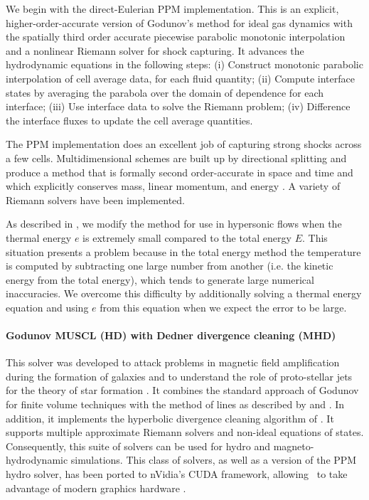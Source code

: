 We begin with the direct-Eulerian PPM implementation.  This is an
explicit, higher-order-accurate version of Godunov's method for ideal
gas dynamics with the spatially third order accurate piecewise parabolic monotonic
interpolation and a nonlinear Riemann solver for shock capturing.  It
advances the hydrodynamic equations in the following steps:
(i) Construct monotonic parabolic interpolation of cell average data,
for each fluid quantity;
(ii) Compute interface states by averaging the parabola over the
domain of dependence for each interface;
(iii) Use interface data to solve the Riemann problem;
(iv) Difference the interface fluxes to update the cell average
quantities.

The PPM implementation does an excellent job of capturing strong
shocks across a few cells.  Multidimensional schemes are built up by
directional splitting and produce a method that is formally second
order-accurate in space and time and which explicitly conserves mass,
linear momentum, and energy \citep{Hawley84, Norman86}.  A variety of
Riemann solvers have been implemented.

As described in \citet{1995CoPhC..89..149B}, we modify the method for use in
hypersonic flows when the thermal energy $e$ is extremely small
compared to the total energy $E$.  This situation presents a problem
because in the total energy method the temperature is computed by
subtracting one large number from another (i.e. the kinetic energy
from the total energy), which tends to generate large numerical
inaccuracies. We overcome this difficulty by additionally solving a
thermal energy equation and using $e$ from this equation when we
expect the error to be large.

\paragraph{Godunov MUSCL (HD) with Dedner divergence cleaning (MHD)}
This solver was developed to attack problems in magnetic field
amplification during the formation of galaxies \citep{Wang:2009a} and
to understand the role of proto-stellar jets for the theory of star
formation \citep{Wang:2009b}. It combines the standard approach of
Godunov \citep{Godunov1959} for finite volume techniques with the
method of lines as described by \cite{leveque2002finite} and
\cite{toro-1997}. In addition, it implements the hyperbolic divergence
cleaning algorithm of \cite{2002JCoPh.175..645D}. It supports multiple
approximate Riemann solvers and non-ideal equations of
states. Consequently, this suite of solvers can be used for hydro and
magneto-hydrodynamic simulations. This class of solvers, as
well as a version of the PPM hydro solver, has been ported to
nVidia's CUDA framework, allowing \enzo\ to take advantage of modern
graphics hardware \citep{Wang:2010}.

